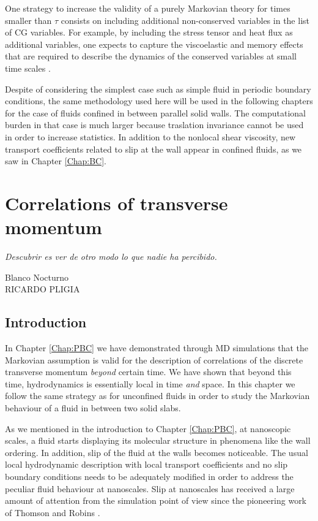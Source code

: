 \documentclass[a4paper,openright,12pt]{book}
\begin{document}
One strategy to increase the validity of a purely Markovian theory for
times   smaller  than   $\tau$   consists   on  including   additional
non-conserved variables in the list  of CG variables.  For example, by
including the stress tensor and heat flux as additional variables, one
expects  to  capture the  viscoelastic  and  memory effects  that  are
required to describe the dynamics  of the conserved variables at small
time scales \cite{Khayat1989,Mryglod1995,Bryk2010}.

Despite of considering the simplest case such as  simple fluid  in periodic  boundary conditions, the  same methodology used here  will be  used in the following chapters for  the case  of fluids
confined in between parallel solid walls.  The computational burden in
that case is much larger  because traslation invariance cannot be used
in order to increase statistics.
In  addition   to  the   nonlocal  shear  viscosity,   new  transport
coefficients related to slip at the wall appear in confined fluids, as
we saw in Chapter \ref{Chap:BC}.


\chapter{Correlations of transverse momentum}\label{Chap:Walls}
\epigraph{\textit{Descubrir es ver de otro modo lo que nadie ha percibido.}}{Blanco Nocturno \\ RICARDO PLIGIA}
\section{Introduction}
In Chapter \ref{Chap:PBC} we have demonstrated
through MD simulations that the Markovian assumption
is  valid  for  the  description   of  correlations  of  the  discrete
transverse momentum \textit{beyond} certain  time.  We have shown that
beyond  this   time,  hydrodynamics  is  essentially   local  in  time
\textit{and} space.  
In this chapter we follow the same strategy as for unconfined fluids in order to study the Markovian behaviour of a fluid in between two solid slabs. 


As we mentioned in the introduction to Chapter \ref{Chap:PBC}, at nanoscopic scales,  a fluid
starts displaying its  molecular structure in phenomena  like the wall
ordering.   In  addition, slip  of  the  fluid  at the  walls  becomes
noticeable.   The  usual  local hydrodynamic  description  with  local
transport coefficients  and no  slip boundary  conditions needs  to be
adequately modified in  order to address the  peculiar fluid behaviour
at  nanoscales. Slip  at nanoscales  has  received a  large amount  of
attention from the simulation point  of view since the pioneering work
of Thomson and Robins \cite{Thompson1990,Koplik1995,Troian1997}.
\end{document}
